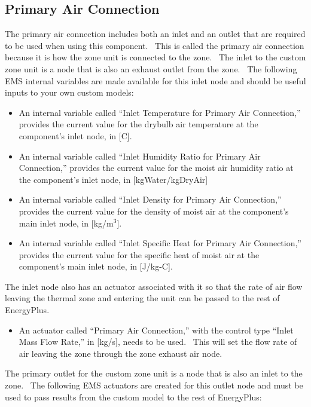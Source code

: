 \subsection{Primary Air Connection}\label{primary-air-connection-000}

The primary air connection includes both an inlet and an outlet that are required to be used when using this component.~ This is called the primary air connection because it is how the zone unit is connected to the zone.~ The inlet to the custom zone unit is a node that is also an exhaust outlet from the zone.~ The following EMS internal variables are made available for this inlet node and should be useful inputs to your own custom models:

\begin{itemize}
\item
  An internal variable called ``Inlet Temperature for Primary Air Connection,'' provides the current value for the drybulb air temperature at the component's inlet node, in {[}C{]}.
\item
  An internal variable called ``Inlet Humidity Ratio for Primary Air Connection,'' provides the current value for the moist air humidity ratio at the component's inlet node, in {[}kgWater/kgDryAir{]}
\item
  An internal variable called ``Inlet Density for Primary Air Connection,'' provides the current value for the density of moist air at the component's main inlet node, in {[}kg/m\(^{3}\){]}.
\item
  An internal variable called ``Inlet Specific Heat for Primary Air Connection,'' provides the current value for the specific heat of moist air at the component's main inlet node, in {[}J/kg-C{]}.
\end{itemize}

The inlet node also has an actuator associated with it so that the rate of air flow leaving the thermal zone and entering the unit can be passed to the rest of EnergyPlus.

\begin{itemize}
\tightlist
\item
  An actuator called ``Primary Air Connection,'' with the control type ``Inlet Mass Flow Rate,'' in {[}kg/s{]}, needs to be used.~ This will set the flow rate of air leaving the zone through the zone exhaust air node.
\end{itemize}

The primary outlet for the custom zone unit is a node that is also an inlet to the zone.~ The following EMS actuators are created for this outlet node and must be used to pass results from the custom model to the rest of EnergyPlus:

